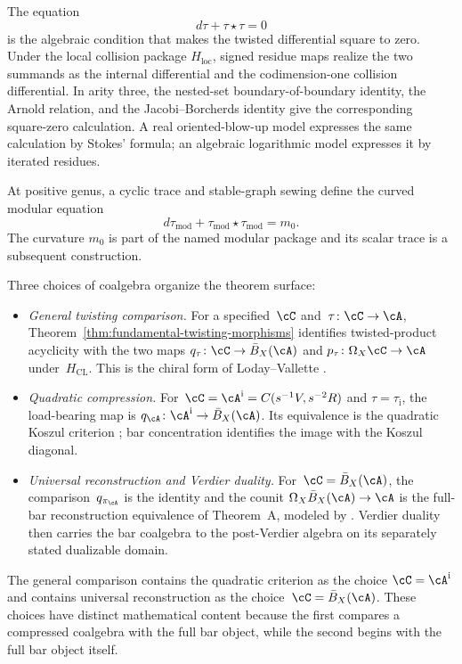 \begin{remark}
\label{rem:MC-is-Stokes}
The equation
\[
 d\tau+\tau\star\tau=0
\]
is the algebraic condition that makes the twisted differential square
to zero.  Under the local collision package
\(H_{\mathrm{loc}}\), signed residue maps realize the two summands as
the internal differential and the codimension-one collision
differential.  In arity three, the nested-set
boundary-of-boundary identity, the Arnold relation, and the
Jacobi--Borcherds identity give the corresponding square-zero
calculation.  A real oriented-blow-up model expresses the same
calculation by Stokes' formula; an algebraic logarithmic model
expresses it by iterated residues.

At positive genus, a cyclic trace and stable-graph sewing define the
curved modular equation
\[
 d\tau_{\mathrm{mod}}
 +\tau_{\mathrm{mod}}\star\tau_{\mathrm{mod}}
 =m_0 .
\]
The curvature \(m_0\) is part of the named modular package and its
scalar trace is a subsequent construction.
\end{remark}
\begin{remark}
\label{rem:theorem-A-decomposition}
Three choices of coalgebra organize the theorem surface:
\begin{itemize}
\item \emph{General twisting comparison.}
 For a specified~$\cC$ and~$\tau\colon\cC\to\cA$,
 Theorem~\ref{thm:fundamental-twisting-morphisms} identifies
 twisted-product acyclicity with the two maps
 $q_\tau\colon\cC\to\bar B_X(\cA)$ and
 $p_\tau\colon\Omega_X\cC\to\cA$ under~$H_{\mathrm{CL}}$.
 This is the chiral form of Loday--Vallette
 \cite[Theorem~2.3.2]{LV12}.
\item \emph{Quadratic compression.}
 For~$\cC=\cA^{\mathrm i}=C(s^{-1}V,s^{-2}R)$ and
 $\tau=\tau_{\mathrm i}$, the load-bearing map is
 $q_\cA\colon\cA^{\mathrm i}\to\bar B_X(\cA)$.
 Its equivalence is the quadratic Koszul criterion
 \cite[Theorem~3.4.6]{LV12}; bar concentration identifies the image
 with the Koszul diagonal.
\item \emph{Universal reconstruction and Verdier duality.}
 For~$\cC=\bar B_X(\cA)$, the comparison~$q_{\pi_\cA}$ is the
 identity and the counit
 $\Omega_X\bar B_X(\cA)\to\cA$ is the full-bar reconstruction
 equivalence of Theorem~A, modeled by
 \cite[Corollary~2.3.4]{LV12}.  Verdier duality then carries the bar
 coalgebra to the post-Verdier algebra on its separately stated
 dualizable domain.
\end{itemize}
The general comparison contains the quadratic criterion as the choice
$\cC=\cA^{\mathrm i}$ and contains universal reconstruction as the
choice~$\cC=\bar B_X(\cA)$.  These choices have distinct mathematical
content because the first compares a compressed coalgebra with the full
bar object, while the second begins with the full bar object itself.
\end{remark}

